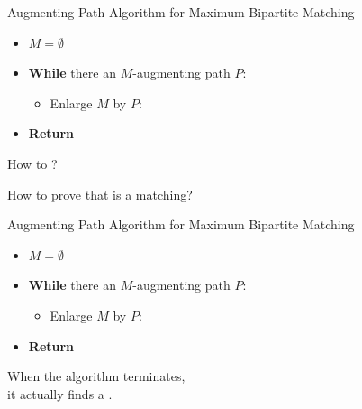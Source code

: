 \begin{frame}{}
  \begin{exampleblock}{Augmenting Path Algorithm for Maximum Bipartite Matching}
    \begin{itemize}
      \setlength{\itemsep}{8pt}
      \pause
      \item $M = \emptyset$
      \pause
      \item {\bf While} there  an $M$-augmenting path $P$:
        \begin{itemize}
          \item Enlarge $M$ by $P$: 
        \end{itemize}
      \pause
      \item {\bf Return} 
    \end{itemize}
  \end{exampleblock}

  \pause
  \vspace{0.60cm}
  \begin{center}
    How to  ?

    \pause
    \vspace{0.30cm}
    How to prove that  is a  matching?
  \end{center}
\end{frame}

\begin{frame}{}
  \begin{exampleblock}{Augmenting Path Algorithm for Maximum Bipartite Matching}
    \begin{itemize}
      \setlength{\itemsep}{8pt}
      \item $M = \emptyset$
      \item {\bf While} there  an $M$-augmenting path $P$:
        \begin{itemize}
          \item Enlarge $M$ by $P$: 
        \end{itemize}
      \item {\bf Return} 
    \end{itemize}
  \end{exampleblock}

  \pause
  \vspace{0.20cm}
  \begin{center}

    \pause
    \vspace{0.30cm}
    When the algorithm terminates, \\[6pt]
    it actually finds a .
  \end{center}
\end{frame}
